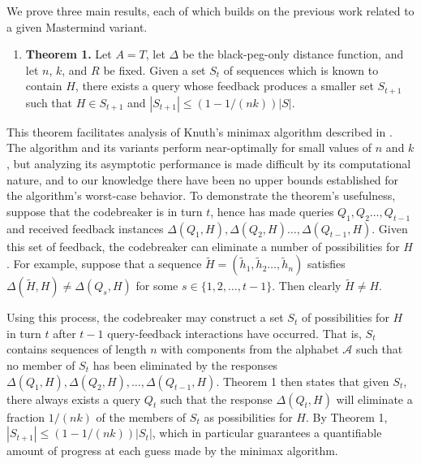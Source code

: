 \documentclass[12pt, a4paper]{article}
\begin{document}
We prove three main results, each of which builds on the previous work related to a given Mastermind variant.
\begin{enumerate}[label=]
	\item\textbf{Theorem 1.} Let $A=T$, let $\Delta$ be the black-peg-only distance function, and let $n$, $k$, and $R$ be fixed. Given a set $S_{t}$ of sequences which is known to contain $H$, there exists a query whose feedback produces a smaller set $S_{t+1}$ such that $H\in S_{t+1}$ and $|S_{t+1}|\le (1-1/(nk))|S|$.
\end{enumerate}
This theorem facilitates analysis of Knuth's minimax algorithm described in \cite{DK76}. The algorithm and its variants perform near-optimally for small values of $n$ and $k$, but analyzing its asymptotic performance is made difficult by its computational nature, and to our knowledge there have been no upper bounds established for the algorithm's worst-case behavior. To demonstrate the theorem's usefulness, suppose that the codebreaker is in turn $t$, hence has made queries $Q_1, Q_2 \ldots, Q_{t-1}$ and received feedback instances $\Delta(Q_1, H), \Delta(Q_2, H) \ldots, \Delta(Q_{t-1},H)$. Given this set of feedback, the codebreaker can eliminate a number of possibilities for $H$. For example, suppose that a sequence $\tilde{H} = (\tilde{h}_1, \tilde{h}_2 \ldots, \tilde{h}_n)$ satisfies $\Delta(\tilde{H}, H)\neq \Delta(Q_s, H)$ for some $s\in\{1,2,\ldots, t-1\}$. Then clearly $\tilde{H}\neq H$.

Using this process, the codebreaker may construct a set $S_t$ of possibilities for $H$ in turn $t$ after $t-1$ query-feedback interactions have occurred. That is, $S_t$ contains sequences of length $n$ with components from the alphabet $\mathcal{A}$ such that no member of $S_t$ has been eliminated by the responses $\Delta(Q_1, H), \Delta(Q_2, H), \ldots, \Delta(Q_{t-1}, H)$. Theorem 1 then states that given $S_t$, there always exists a query $Q_t$ such that the response $\Delta(Q_t, H)$ will eliminate a fraction $1/(nk)$ of the members of $S_t$ as possibilities for $H$. By Theorem 1, $|S_{t+1}|\le (1-1/(nk))|S_{t}|$, which in particular guarantees a quantifiable amount of progress at each guess made by the minimax algorithm.
\end{document}
